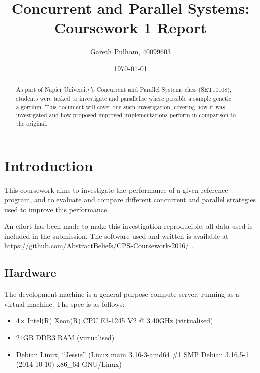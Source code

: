 \documentclass[a4paper]{article}
\begin{document}
    \begin{titlepage}
        \title{Concurrent and Parallel Systems: Coursework 1 Report}
        \author{Gareth Pulham, 40099603}
        \date{\today}
        \maketitle
        \thispagestyle{empty}
        \begin{abstract}
            As part of Napier University's Concurrent and Parallel Systems class (SET10108), students were tasked to
            investigate and parallelise where possible a sample genetic algortihm. This document will cover one such
            investigation, covering how it was investigated and how proposed improved implementations perform in
            comparison to the original.
        \end{abstract}
    \end{titlepage}

    \tableofcontents

    \section{Introduction}
    This coursework aims to investigate the performance of a given reference program, and to evaluate and compare
    different concurrent and parallel strategies used to improve this performance.

    An effort has been made to make this investigation reproducible: all data used is included in the submission. The
    software used and written is available at \url{https://github.com/AbstractBeliefs/CPS-Coursework-2016/} .

        \subsection{Hardware}
        The development machine is a general purpose compute server, running as a virtual machine. The spec is as
        follows:
        \begin{itemize}
            \item 4$\times$ Intel(R) Xeon(R) CPU E3-1245 V2 @ 3.40GHz (virtualised)
            \item 24GB DDR3 RAM (virtualised)
            \item Debian Linux, ``Jessie'' (Linux main 3.16-3-amd64 \#1 SMP Debian 3.16.5-1 (2014-10-10) x86\_64 GNU/Linux)
        \end{itemize}
\end{document}
